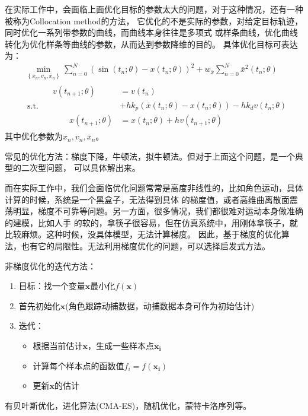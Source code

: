 \documentclass[lang=cn,newtx,10pt,scheme=chinese]{elegantbook}
\begin{document}
在实际工作中，会面临上面优化目标的参数太大的问题，对于这种情况，还有一种被称为Collocation method的方法，
它优化的不是实际的参数，对给定目标轨迹，同时优化一系列带参数的曲线，而曲线本身往往是多项式
或样条曲线，优化曲线转化为优化样条等曲线的参数，从而达到参数降维的目的。
具体优化目标可表达为：
\begin{equation}
  \begin{aligned}
  & \min _{\left\{x_n, v_n, \bar{x}_n\right\}} \sum_{n=0}^N\left(\sin \left(t_n ; \theta\right)-x\left(t_n ; \theta\right)\right)^2+w_{\bar{x}} \sum_{n=0}^N \bar{x}^2\left(t_n ; \theta\right) \\
  & \text { s.t. } \quad \begin{aligned}
  v\left(t_{n+1} ; \theta\right) & =v\left(t_n\right) \\
  & +h k_p\left(\bar{x}\left(t_n ; \theta\right)-x\left(t_n ; \theta\right)\right)-h k_d v\left(t_n ; \theta\right) \\
  \qquad x\left(t_{n+1} ; \theta\right) & =x\left(t_n ; \theta\right)+h v\left(t_{n+1} ; \theta\right)
  \end{aligned}
  \end{aligned}
\end{equation}
其中优化参数为${x_n, v_n, \bar{x}_n}$。

常见的优化方法：梯度下降，牛顿法，拟牛顿法。但对于上面这个问题，是一个典型的二次型问题，
可以具体解出来。

而在实际工作中，我们会面临优化问题常常是高度非线性的，比如角色运动，具体计算的时候，系统是一个黑盒子，无法得到具体
的梯度值，或者高维曲离散面震荡明显，梯度不可靠等问题。另一方面，很多情况，我们都很难对运动本身做准确的建模，比如人手
的软的，拿筷子很容易，但在仿真系统中，用刚体拿筷子，就比较麻烦。这种时候，没具体模型，无法计算梯度。
因此，基于梯度的优化算法，也有它的局限性。无法利用梯度优化的问题，可以选择启发式方法。

非梯度优化的迭代方法：
\begin{enumerate}[itemindent=2em]
  \item 目标：找一个变量$\boldsymbol{x}$最小化$f(\boldsymbol{x})$
  \item 首先初始化$\boldsymbol{x}$(角色跟踪动捕数据，动捕数据本身可作为初始估计)
  \item 迭代：
  \begin{itemize}[itemindent=2em]
    \item 根据当前估计$\boldsymbol{x}$，生成一些样本点${\boldsymbol{x_i}}$
    \item 计算每个样本点的函数值$f_i = f(\boldsymbol{x_i})$
    \item 更新$\boldsymbol{x}$的估计
  \end{itemize}
\end{enumerate}
有贝叶斯优化，进化算法(CMA-ES)，随机优化，蒙特卡洛序列等。
\end{document}
